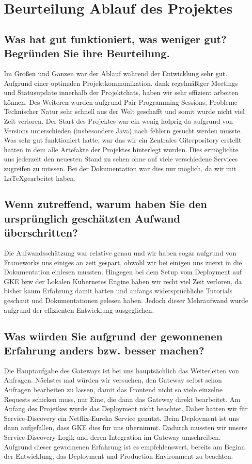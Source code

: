\section{Beurteilung Ablauf des Projektes}

\subsection{Was hat gut funktioniert, was weniger gut? Begründen Sie ihre Beurteilung.}

Im Großen und Ganzen war der Ablauf während der Entwicklung sehr gut. Aufgrund einer optimalen Projektkommunikation, dank regelmäßiger Meetings und Statusupdate innerhalb der Projektchats, haben wir sehr effizient arbeiten können. Des Weiteren wurden aufgrund Pair-Programming Sessions, Probleme Technischer Natur sehr schnell aus der Welt geschafft und somit wurde nicht viel Zeit verloren. Der Start des Projektes war ein wenig holprig da aufgrund von Versions unterschieden (insbesondere Java) nach fehlern gesucht werden musste. Was sehr gut funktioniert hatte, war das wir ein Zentrales Gitrepository erstellt hatten in dem alle Artefakte der Projektes hinterlegt wurden. Dies ermöglichte uns jederzeit den neuesten Stand zu sehen ohne auf viele verschiedene Services zugreifen zu müssen. Bei der Dokumentation war dies nur möglich, da wir mit \LaTeX gearbeitet haben.

\subsection{Wenn zutreffend, warum haben Sie den ursprünglich geschätzten Aufwand überschritten?}

Die Aufwandsschätzung war relative genau und wir haben sogar aufgrund von Frameworks uns einiges an zeit gespart, obwohl wir bei einigen uns zuerst in die Dokumentation einlesen mussten. Hingegen bei dem Setup vom Deployment auf GKE bzw der Lokalen Kubernetes Engine haben wir recht viel Zeit verloren, da bisher kaum Erfahrung damit hatten und anfangs widersprüchliche Tutorials geschaut und Dokumentationen gelesen haben. Jedoch dieser Mehraufwand wurde aufgrund der effizienten Entwicklung ausgeglichen.

\subsection{Was würden Sie aufgrund der gewonnenen Erfahrung anders bzw. besser machen?}

Die Hauptaufgabe des Gateways ist bei uns hauptsächlich das Weiterleiten von Anfragen. Nächstes mal würden wir versuchen, den Gateway selbst schon Anfragen bearbeiten zu lassen, damit das Frontend nicht so viele einzelne Requests schicken muss, nur Eine, die dann das Gateway direkt bearbeitet.  
Am Anfang des Projetkes wurde das Deployment nicht beachtet. Daher hatten wir für Service-Discovery ein Netflix-Eureka Service genutzt. Beim Deployment ist uns dann aufgefallen, dass GKE dies für uns übernimmt. Dadurch mussten wir unsere Service-Discovery-Logik und deren Integration im Gateway umschreiben. Aufgrund dieser gewonnenen Erfahrung ist es empfehlenswert, bereits am Beginn der Entwicklung, das Deployment und Production-Environment zu beachten. 
